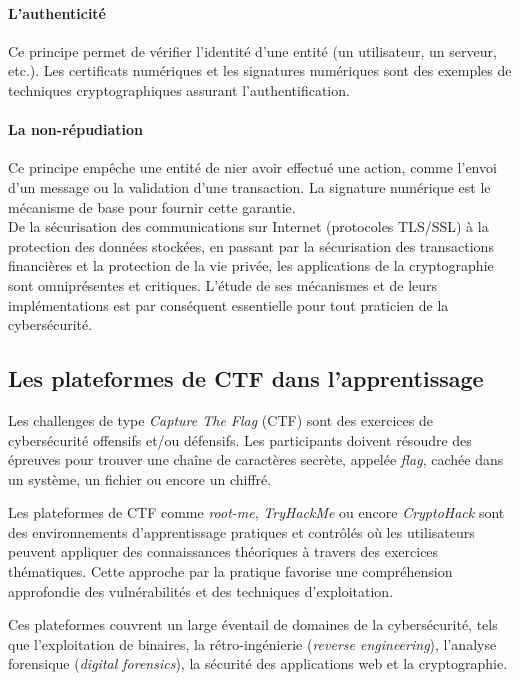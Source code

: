 \paragraph{L'authenticité}
Ce principe permet de vérifier l'identité d'une entité (un utilisateur, un
serveur, etc.). Les certificats numériques et les signatures numériques sont
des exemples de techniques cryptographiques assurant l'authentification.

\paragraph{La non-répudiation}
Ce principe empêche une entité de nier avoir effectué une action, comme
l'envoi d'un message ou la validation d'une transaction. La signature
numérique est le mécanisme de base pour fournir cette garantie.\\

De la sécurisation des communications sur Internet (protocoles TLS/SSL) à
la protection des données stockées, en passant par la sécurisation des
transactions financières et la protection de la vie privée, les
applications de la cryptographie sont omniprésentes et critiques. L'étude
de ses mécanismes et de leurs implémentations est par conséquent
essentielle pour tout praticien de la cybersécurité.

\subsection{Les plateformes de CTF dans l'apprentissage}
Les challenges de type \textit{Capture The Flag} (CTF) sont des exercices de
cybersécurité offensifs et/ou défensifs. Les participants doivent résoudre
des épreuves pour trouver une chaîne de caractères secrète, appelée
\textit{flag}, cachée dans un système, un fichier ou encore un chiffré.

Les plateformes de CTF comme \textit{root-me}, \textit{TryHackMe} ou encore
\textit{CryptoHack} sont des environnements d'apprentissage pratiques et
contrôlés où les utilisateurs peuvent appliquer des connaissances théoriques
à travers des exercices thématiques. Cette approche par la pratique favorise
une compréhension approfondie des vulnérabilités et des techniques
d'exploitation.

Ces plateformes couvrent un large éventail de domaines de la cybersécurité,
tels que l'exploitation de binaires, la rétro-ingénierie (\textit{reverse
engineering}), l'analyse forensique (\textit{digital forensics}), la
sécurité des applications web et la cryptographie.

